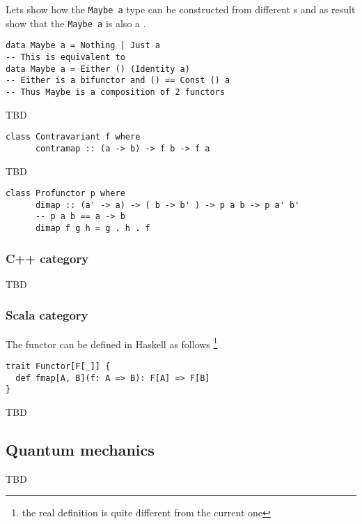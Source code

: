 \begin{example}
\label{ex:maybe_functor}
Lets show how the \texttt{Maybe a} type can be
constructed from different 
s and as result show that the
\texttt{Maybe a} is also a
. 
\begin{verbatim}
data Maybe a = Nothing | Just a
-- This is equivalent to
data Maybe a = Either () (Identity a)
-- Either is a bifunctor and () == Const () a 
-- Thus Maybe is a composition of 2 functors 
\end{verbatim}
\end{example}

\begin{example}
\label{ex:contravariant_functor_hask}
TBD
\begin{verbatim}
class Contravariant f where
      contramap :: (a -> b) -> f b -> f a
\end{verbatim}
\end{example}

\begin{example}
\label{ex:contravariant_functor_hask}
TBD
\begin{verbatim}
class Profunctor p where
      dimap :: (a' -> a) -> ( b -> b' ) -> p a b -> p a' b'
      -- p a b == a -> b
      dimap f g h = g . h . f
\end{verbatim}
\end{example}


\subsubsection{\textbf{C++} category}
TBD

\subsubsection{\textbf{Scala} category}
The functor can be defined in Haskell as follows
\footnote{the real definition is quite different from the current one}
\begin{example}
\label{ex:functor_scala}
\begin{verbatim}
trait Functor[F[_]] {
  def fmap[A, B](f: A => B): F[A] => F[B]
}\end{verbatim} 
\end{example}

TBD

\subsection{Quantum mechanics}

TBD
